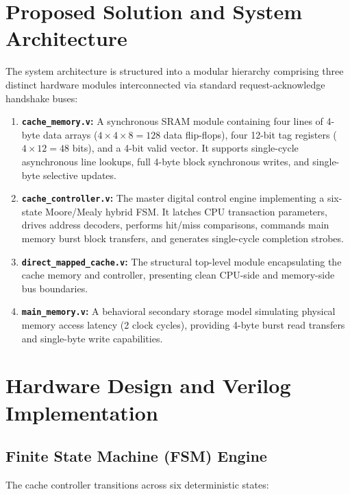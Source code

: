 \documentclass[conference]{IEEEtran}
\begin{document}
\section{Proposed Solution and System Architecture}
The system architecture is structured into a modular hierarchy comprising three distinct hardware modules interconnected via standard request-acknowledge handshake buses:

\begin{enumerate}
    \item \textbf{\texttt{cache\_memory.v}:} A synchronous SRAM module containing four lines of 4-byte data arrays ($4 \times 4 \times 8 = 128$ data flip-flops), four 12-bit tag registers ($4 \times 12 = 48$ bits), and a 4-bit valid vector. It supports single-cycle asynchronous line lookups, full 4-byte block synchronous writes, and single-byte selective updates.
    \item \textbf{\texttt{cache\_controller.v}:} The master digital control engine implementing a six-state Moore/Mealy hybrid FSM. It latches CPU transaction parameters, drives address decoders, performs hit/miss comparisons, commands main memory burst block transfers, and generates single-cycle completion strobes.
    \item \textbf{\texttt{direct\_mapped\_cache.v}:} The structural top-level module encapsulating the cache memory and controller, presenting clean CPU-side and memory-side bus boundaries.
    \item \textbf{\texttt{main\_memory.v}:} A behavioral secondary storage model simulating physical memory access latency (2 clock cycles), providing 4-byte burst read transfers and single-byte write capabilities.
\end{enumerate}

\section{Hardware Design and Verilog Implementation}

\subsection{Finite State Machine (FSM) Engine}
The cache controller transitions across six deterministic states:
\end{document}
